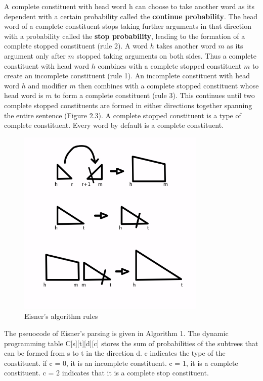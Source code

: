 \documentclass{book}
\begin{document}
A complete constituent with head word h can choose to take another word as its dependent with a certain probability called the \textbf{continue probability}. The head word of a complete constituent stops taking further arguments in that direction with a probability called the \textbf{stop probability}, leading to the formation of a complete stopped constituent (rule 2). A word $h$ takes another word $m$ as its argument only after $m$ stopped taking arguments on both sides. Thus a complete constituent with head word $h$ combines with a complete stopped constituent $m$ to create an incomplete constituent (rule 1). An incomplete constituent with head word $h$ and modifier $m$ then combines with a complete stopped constituent whose head word is $m$ to form a complete constituent (rule 3). This continues until two complete stopped constituents are formed in either directions together spanning the entire sentence (Figure 2.3). A complete stopped constituent is a type of complete constituent. Every word by default is a complete constituent.

\begin{figure}
\centering
\includegraphics[width=90mm]{images/eisner_rules.jpg}
\caption{Eisner's algorithm rules}
\label{overflow}
\end{figure}


The pseuocode of Eisner's parsing is given in Algorithm 1. The dynamic programming table C[s][t][d][c] stores the sum of probabilities of the subtrees that can be formed from s to t in the direction d. c indicates the type of the constituent. if c = 0, it is an incomplete constituent. c = 1, it is a complete constituent. c = 2 indicates that it is a complete stop constituent.
\end{document}
